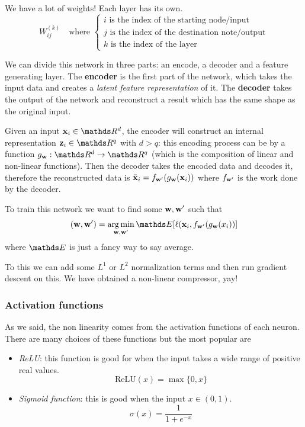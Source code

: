 \documentclass[12pt]{extarticle}
\renewcommand{\vec}[1]{\bvec{#1}}
\begin{document}
We have a lot of weights! Each layer has its own.
\begin{equation}
	W_{ij}^{(k)} \quad \text{where } \begin{cases}
		i \text{ is the index of the starting node/input}     \\
		j \text{ is the index of the destination note/output} \\
		k \text{ is the index of the layer}
	\end{cases}
\end{equation}

We can divide this network in three parts: an encode, a decoder and a feature generating layer.
The \textbf{encoder} is the first part of the network, which takes the input data and creates a
\emph{latent feature representation} of it.
The \textbf{decoder} takes the output of the network and reconstruct a result which has the same
shape as the original input.

Given an input $\vec x_i \in \R^d$, the encoder will construct an internal representation
$\vec z_i \in \R^q$ with $d > q$: this encoding process can be  by a function
$g_{\vec w}: \R^d \to \R^q$ (which is the composition of linear and non-linear functions).
Then the decoder takes the encoded data and decodes it, therefore the reconstructed data is
$\tilde{\vec x}_i = f_{\vec w'}(g_{\vec w}(\vec x_i))$ where $f_{\vec w'}$ is the work done by the
decoder.

To train this network we want to find some $\vec w, \vec w'$ such that
\begin{equation}
	(\vec w, \vec w') = \argmin_{ \vec w, \vec w' }
	\E [ \ell( \vec x_i, f_{\vec w'}(g_{\vec w}(x_i))]
\end{equation}
where $\E$ is just a fancy way to say average.

To this we can add some $L^1$ or $L^2$ normalization terms and then run gradient descent on this.
We have obtained a non-linear compressor, yay!

\subsubsection{Activation functions}

As we said, the non linearity comes from the activation functions of each neuron.
There are many choices of these functions but the most popular are
\begin{itemize}
	\item \emph{ReLU}: this function is good for when the input takes a wide range of positive real
	      values.
	      \begin{equation}
		      \mathrm{ReLU}(x) = \max \{ 0, x \}
	      \end{equation}

	\item \emph{Sigmoid function}: this is good when the input $x \in (0, 1)$.
	      \begin{equation}
		      \sigma(x) = \frac{1}{1+e^{-x}}
	      \end{equation}

\end{itemize}
\end{document}

